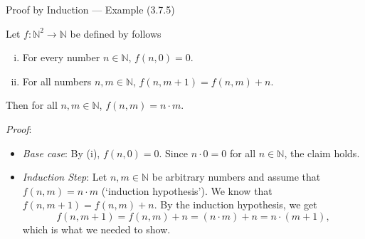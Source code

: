 \documentclass[../slides.tex]{subfiles}
\begin{document}
\begin{frame}{Proof by Induction --- Example (3.7.5)}

Let $f:\mathbb{N}^2\to\mathbb{N}$ be defined by  follows
	\begin{enumerate}[(i)]
	
		\item For every number $n\in\mathbb{N}$, $f(n, 0)=0$.
		
		\item For all numbers $n,m\in\mathbb{N}$, $f(n,m+1)=f(n,m)+n$.
	
	\end{enumerate}
Then for all $n,m\in\mathbb{N}$, $f(n,m)=n\cdot m$.

\emph{Proof}:

\begin{itemize}

	\item \emph{Base case}: By (i), $f(n,0)=0$. Since $n\cdot 0=0$ for all $n\in\mathbb{N}$, the claim holds.
	
	\item \emph{Induction Step}: Let $n,m\in\mathbb{N}$ be arbitrary numbers and assume that $f(n,m)=n\cdot m$ (`induction hypothesis'). We know that $f(n,m+1)=f(n,m)+n$. By the induction hypothesis, we get {\small\[f(n,m+1)=f(n,m)+n=(n\cdot m)+n=n\cdot (m+1),\]} which is what we needed to show.
	
\end{itemize}
\end{frame}
\end{document}
